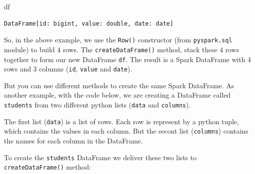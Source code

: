 \documentclass[
  11pt,
  letterpaper,
  DIV=11,
  numbers=noendperiod]{scrreprt}
\newenvironment{Shaded}{\begin{snugshade}}{\end{snugshade}}
\newcommand{\NormalTok}[1]{\textcolor[rgb]{0.00,0.23,0.31}{#1}}
\begin{document}
\begin{Shaded}
\begin{Highlighting}[]
\NormalTok{df}
\end{Highlighting}
\end{Shaded}

\begin{verbatim}
DataFrame[id: bigint, value: double, date: date]
\end{verbatim}

So, in the above example, we use the \texttt{Row()} constructor (from
\texttt{pyspark.sql} module) to build 4 rows. The
\texttt{createDataFrame()} method, stack these 4 rows together to form
our new DataFrame \texttt{df}. The result is a Spark DataFrame with 4
rows and 3 columns (\texttt{id}, \texttt{value} and \texttt{date}).

But you can use different methods to create the same Spark DataFrame. As
another example, with the code below, we are creating a DataFrame called
\texttt{students} from two different python lists (\texttt{data} and
\texttt{columns}).

The first list (\texttt{data}) is a list of rows. Each row is represent
by a python tuple, which contains the values in each column. But the
secont list (\texttt{columns}) contains the names for each column in the
DataFrame.

To create the \texttt{students} DataFrame we deliver these two lists to
\texttt{createDataFrame()} method:
\end{document}
